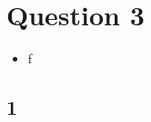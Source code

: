 
\section{Question 3}

\begin{itemize}
    \item  f
\end{itemize}

\begin{solve}

    \subsection{1}

    
\end{solve}